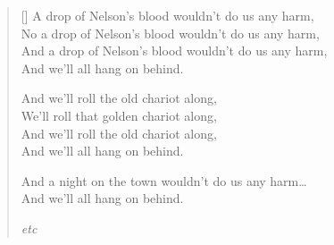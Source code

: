 \pagebreak
\settowidth{\versewidth}{A drop of Nelson's blood wouldn't do us any harm}
\begin{verse}[\versewidth]
A drop of Nelson's blood wouldn't do us any harm,\\
No a drop of Nelson's blood wouldn't do us any harm,\\
And a drop of Nelson's blood wouldn't do us any harm,\\
And we'll all hang on behind.

\begin{chorus}
And we'll roll the old chariot along,\\
We'll roll that golden chariot along,\\
And we'll roll the old chariot along,\\
And we'll all hang on behind.
\end{chorus}

And a night on the town wouldn't do us any harm\dots\\
And we'll all hang on behind.

\textit{etc}

\end{verse}
